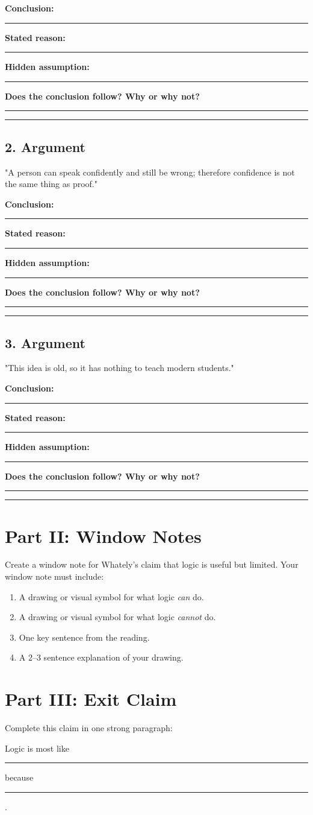 \documentclass[12pt]{article}
\newcommand{\focusbox}[1]{\par\vspace{0.4em}\noindent\begingroup\setlength{\fboxsep}{6pt}\colorbox{gray!12}{\begin{minipage}{\dimexpr\linewidth-2\fboxsep\relax}#1\end{minipage}}\endgroup\par\vspace{0.5em}}
\newcommand{\studentline}{\vspace{0.35em}\hrule\vspace{0.65em}}
\begin{document}
\textbf{Conclusion:}\studentline
\textbf{Stated reason:}\studentline
\textbf{Hidden assumption:}\studentline
\textbf{Does the conclusion follow? Why or why not?}\studentline\studentline

\subsection*{2. Argument}
"A person can speak confidently and still be wrong; therefore confidence is not the same thing as proof."

\textbf{Conclusion:}\studentline
\textbf{Stated reason:}\studentline
\textbf{Hidden assumption:}\studentline
\textbf{Does the conclusion follow? Why or why not?}\studentline\studentline

\subsection*{3. Argument}
"This idea is old, so it has nothing to teach modern students."

\textbf{Conclusion:}\studentline
\textbf{Stated reason:}\studentline
\textbf{Hidden assumption:}\studentline
\textbf{Does the conclusion follow? Why or why not?}\studentline\studentline

\section*{Part II: Window Notes}
Create a window note for Whately's claim that logic is useful but limited. Your window note must include:

\begin{enumerate}[leftmargin=*]
\item A drawing or visual symbol for what logic \textit{can} do.
\item A drawing or visual symbol for what logic \textit{cannot} do.
\item One key sentence from the reading.
\item A 2--3 sentence explanation of your drawing.
\end{enumerate}

\vspace{2.2in}

\section*{Part III: Exit Claim}
Complete this claim in one strong paragraph:

\focusbox{Logic is most like \rule{1.7in}{0.4pt} because \rule{2.4in}{0.4pt}.}

\vspace{1.4in}
\end{document}
